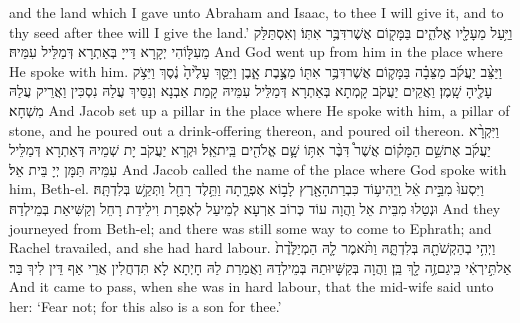 {and the land which I gave unto Abraham and Isaac, to thee I will give it, and to thy seed after thee will I give the land.’}{}
{וַיַּ֥עַל מֵעָלָ֖יו אֱלֹהִ֑ים בַּמָּק֖וֹם אֲשֶׁר\maqqaf דִּבֶּ֥ר אִתּֽוֹ׃}
{וְאִסְתַּלַּק מֵעִלָּוֹהִי יְקָרָא דַּייָ בְּאַתְרָא דְּמַלֵּיל עִמֵּיהּ׃}
{And God went up from him in the place where He spoke with him.}{}
{וַיַּצֵּ֨ב יַעֲקֹ֜ב מַצֵּבָ֗ה בַּמָּק֛וֹם אֲשֶׁר\maqqaf דִּבֶּ֥ר אִתּ֖וֹ מַצֶּ֣בֶת אָ֑בֶן וַיַּסֵּ֤ךְ עָלֶ֙יהָ֙ נֶ֔סֶךְ וַיִּצֹ֥ק עָלֶ֖יהָ שָֽׁמֶן׃}
{וַאֲקֵים יַעֲקֹב קָמְתָא בְּאַתְרָא דְּמַלֵּיל עִמֵּיהּ קָמַת אַבְנָא וְנַסֵּיךְ עֲלַהּ נִסְכִּין וַאֲרֵיק עֲלַהּ מִשְׁחָא׃}
{And Jacob set up a pillar in the place where He spoke with him, a pillar of stone, and he poured out a drink-offering thereon, and poured oil thereon.}{}
{וַיִּקְרָ֨א יַעֲקֹ֜ב אֶת\maqqaf שֵׁ֣ם הַמָּק֗וֹם אֲשֶׁר֩ דִּבֶּ֨ר אִתּ֥וֹ שָׁ֛ם אֱלֹהִ֖ים בֵּֽית\maqqaf אֵֽל׃}
{וּקְרָא יַעֲקֹב יָת שְׁמֵיהּ דְּאַתְרָא דְּמַלֵּיל עִמֵּיהּ תַּמָּן יְיָ בֵּית אֵל׃}
{And Jacob called the name of the place where God spoke with him, Beth-el.}{}
{וַיִּסְעוּ֙ מִבֵּ֣ית אֵ֔ל וַֽיְהִי\maqqaf ע֥וֹד כִּבְרַת\maqqaf הָאָ֖רֶץ לָב֣וֹא אֶפְרָ֑תָה וַתֵּ֥לֶד רָחֵ֖ל וַתְּקַ֥שׁ בְּלִדְתָּֽהּ׃}
{וּנְטַלוּ מִבֵּית אֵל וַהֲוָה עוֹד כְּרוֹב אַרְעָא לְמֵיעַל לְאֶפְרָת וִילֵידַת רָחֵל וְקַשִּׁיאַת בְּמֵילְדַהּ׃}
{And they journeyed from Beth-el; and there was still some way to come to Ephrath; and Rachel travailed, and she had hard labour.}{}
{וַיְהִ֥י בְהַקְשֹׁתָ֖הּ בְּלִדְתָּ֑הּ וַתֹּ֨אמֶר לָ֤הּ הַמְיַלֶּ֙דֶת֙ אַל\maqqaf תִּ֣ירְאִ֔י כִּֽי\maqqaf גַם\maqqaf זֶ֥ה לָ֖ךְ בֵּֽן׃}
{וַהֲוָה בְּקַשָּׁיוּתַהּ בְּמֵילְדַהּ וַאֲמַרַת לַהּ חָיְתָא לָא תִּדְחֲלִין אֲרֵי אַף דֵּין לִיךְ בַּר׃}
{And it came to pass, when she was in hard labour, that the mid-wife said unto her: ‘Fear not; for this also is a son for thee.’}{}
